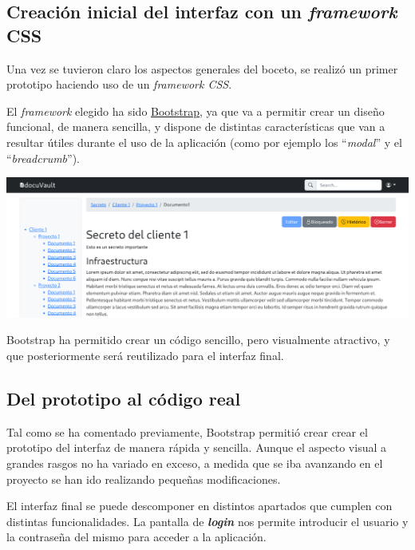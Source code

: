 \documentclass{\ClassPath/viu-tfm-template}
\begin{document}
\subsection{Creación inicial del interfaz con un \textit{framework} CSS}
Una vez se tuvieron claro los aspectos generales del boceto, se realizó un primer prototipo haciendo uso de un \textit{framework CSS}.

El \textit{framework} elegido ha sido \href{https://getbootstrap.com/}{Bootstrap}, ya que va a permitir crear un diseño funcional, de manera sencilla, y dispone de distintas características que  van a resultar útiles durante el uso de la aplicación (como por ejemplo los “\textit{modal}” y el “\textit{breadcrumb}”).

\begin{center}
    \includegraphics[frame,width=\linewidth]{img/boceto2.png}
    \vspace{-20pt}
\end{center}

Bootstrap ha permitido crear un código sencillo, pero visualmente atractivo, y que posteriormente será reutilizado para el interfaz final.


\subsection{Del prototipo al código real}

Tal como se ha comentado previamente, Bootstrap permitió crear crear el prototipo del interfaz de manera rápida y sencilla. Aunque el aspecto visual a grandes rasgos no ha variado en exceso, a medida que se iba avanzando en el proyecto se han ido realizando pequeñas modificaciones.

El interfaz final se puede descomponer en distintos apartados que cumplen con distintas funcionalidades. La pantalla de \textit{\textbf{login}} nos permite introducir el usuario y la contraseña del mismo para acceder a la aplicación.
\end{document}
